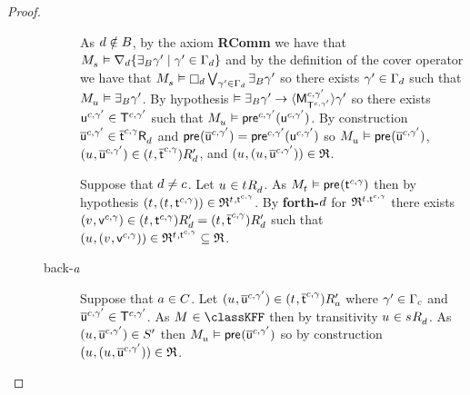 \begin{proof}
\begin{description}
\begin{description}
                As $\agentD \notin \agentsB$, by the \axiomAamlKFF{} axiom {\bf RComm} we have that $\kPModel{\kStateS} \entails \coversD \{\someactsBs \gamma' \mid \gamma' \in \Gamma_\agentD\}$ and by the definition of the cover operator we have that $\kPModel{\kStateS} \entails \necessaryD \bigvee_{\gamma' \in \Gamma_\agentD} \someactsBs \gamma'$ so there exists $\gamma' \in \Gamma_\agentD$ such that $\kPModel{\kStateU} \entails \someactsBs \gamma'$.
                By hypothesis $\entails \someactsBs \gamma' \implies \actionE{\aPModel[\agentC, \gamma']{\aStatesT[\agentC, \gamma']}} \gamma'$ so there exists $\aStateU[\agentC, \gamma'] \in \aStatesT[\agentC, \gamma']$ such that $\kPModel{\kStateU} \entails \aPrecondition[\agentC, \gamma'](\aStateU[\agentC, \gamma'])$.
                By construction $\aPStateU[\agentC, \gamma'] \in \aSuccessorsD{\aPStateT[\agentC, \gamma]}$ and $\aPrecondition(\aPStateU[\agentC, \gamma']) = \aPrecondition[\agentC, \gamma'](\aStateU[\agentC, \gamma'])$ so $\kPModel{\kStateU} \entails \aPrecondition(\aPStateU[\agentC, \gamma'])$, $(\kStateU, \aPStateU[\agentC, \gamma']) \in \kSuccessorsPD{(\kStateT, \aPStateT[\agentC, \gamma])}$, and $(\kStateU, (\kStateU, \aPStateU[\agentC, \gamma'])) \in \refinement$.

                Suppose that $\agentD \neq \agentC$.
                Let $\kStateU \in \kSuccessorsD{\kStateT}$.
                As $\kPModel{\kStateT} \entails \aPrecondition(\aStateT[\agentC, \gamma])$ then by hypothesis $(\kStateT, (\kStateT, \aStateT[\agentC, \gamma])) \in \refinement^{\kStateT, \aStateT[\agentC, \gamma]}$.
                By {\bf forth-$\agentD$} for $\refinement^{\kStateT, \aStateT[\agentC, \gamma]}$ there exists $(\kStateV, \aStateV[\agentC, \gamma]) \in \kSuccessorsPD{(\kStateT, \aStateT[\agentC, \gamma])} = \kSuccessorsPD{(\kStateT, \aPStateT[\agentC, \gamma])}$ such that $(\kStateU, (\kStateV, \aStateV[\agentC, \gamma])) \in \refinement^{\kStateT, \aStateT[\agentC, \gamma]} \subseteq \refinement$.
            \item[back-$\agentA$]
                Suppose that $\agentA \in \agentsC$.
                Let $(\kStateU, \aPStateU[\agentC, \gamma']) \in \kSuccessorsPA{(\kStateT, \aPStateT[\agentC, \gamma])}$ where $\gamma' \in \Gamma_\agentC$ and $\aPStateU[\agentC, \gamma'] \in \aStatesT[\agentC, \gamma']$.
                As $\kModel \in \classKFF$ then by transitivity $\kStateU \in \kSuccessorsD{\kStateS}$.
                As $(\kStateU, \aPStateU[\agentC, \gamma']) \in \kStatesP$ then $\kPModel{\kStateU} \entails \aPrecondition(\aPStateU[\agentC, \gamma'])$ so by construction $(\kStateU, (\kStateU, \aPStateU[\agentC, \gamma'])) \in \refinement$.


\end{description}
\end{description}
\end{proof}

